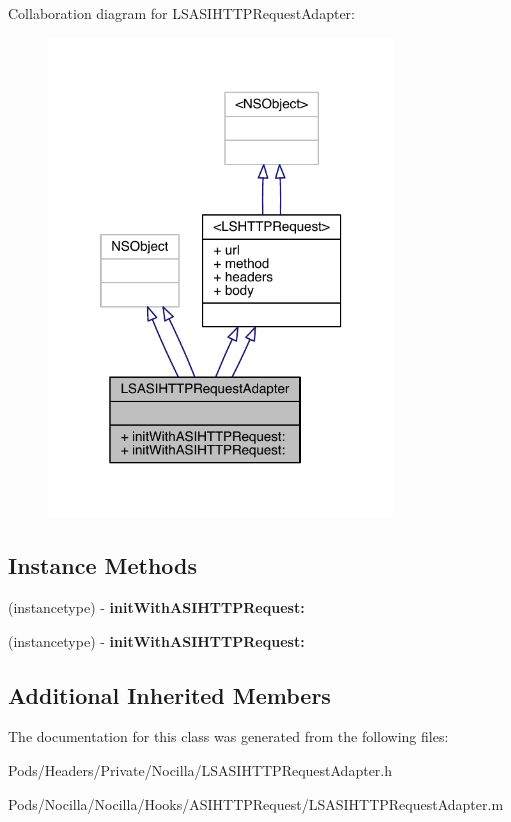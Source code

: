 Collaboration diagram for L\-S\-A\-S\-I\-H\-T\-T\-P\-Request\-Adapter\-:\nopagebreak
\begin{figure}[H]
\begin{center}
\leavevmode
\includegraphics[width=259pt]{interface_l_s_a_s_i_h_t_t_p_request_adapter__coll__graph}
\end{center}
\end{figure}
\subsection*{Instance Methods}
\begin{DoxyCompactItemize}
\item 
\hypertarget{interface_l_s_a_s_i_h_t_t_p_request_adapter_a1bcd70c2966ebbcd49dfa277cb34a27a}{(instancetype) -\/ {\bfseries init\-With\-A\-S\-I\-H\-T\-T\-P\-Request\-:}}\label{interface_l_s_a_s_i_h_t_t_p_request_adapter_a1bcd70c2966ebbcd49dfa277cb34a27a}

\item 
\hypertarget{interface_l_s_a_s_i_h_t_t_p_request_adapter_a1bcd70c2966ebbcd49dfa277cb34a27a}{(instancetype) -\/ {\bfseries init\-With\-A\-S\-I\-H\-T\-T\-P\-Request\-:}}\label{interface_l_s_a_s_i_h_t_t_p_request_adapter_a1bcd70c2966ebbcd49dfa277cb34a27a}

\end{DoxyCompactItemize}
\subsection*{Additional Inherited Members}


The documentation for this class was generated from the following files\-:\begin{DoxyCompactItemize}
\item 
Pods/\-Headers/\-Private/\-Nocilla/L\-S\-A\-S\-I\-H\-T\-T\-P\-Request\-Adapter.\-h\item 
Pods/\-Nocilla/\-Nocilla/\-Hooks/\-A\-S\-I\-H\-T\-T\-P\-Request/L\-S\-A\-S\-I\-H\-T\-T\-P\-Request\-Adapter.\-m\end{DoxyCompactItemize}
